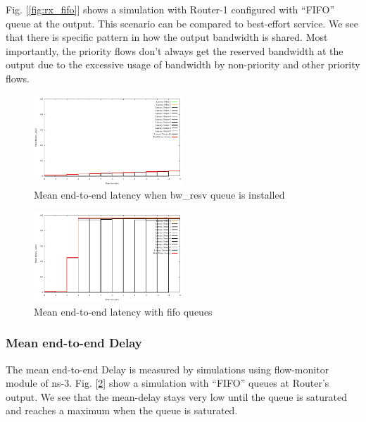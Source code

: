\documentclass[conference]{IEEEtran}
\begin{document}
Fig. [\ref{fig:rx_fifo}] shows a simulation with Router-1 configured with ``FIFO'' queue at the output. This scenario can be compared to best-effort service. We see that there is specific pattern in how the output bandwidth is shared. Most importantly, the priority flows don't always get the reserved bandwidth at the output due to the excessive usage of bandwidth by non-priority and other priority flows.

\begin{figure}[ht]
	\begin{center}
		\includegraphics[width=0.50\textwidth]{plots/delay_detnet.pdf}
		\caption{Mean end-to-end latency when bw\_resv queue is installed}\label{fig:delay_detnet}
	\end{center}
\end{figure}
\begin{figure}[ht]
	\begin{center}
		\includegraphics[width=0.50\textwidth]{plots/delay_fifo.pdf}
		\caption{Mean end-to-end latency with fifo queues}\label{fig:delay_fifo}
	\end{center}
\end{figure}

\subsubsection{Mean end-to-end Delay}
The mean end-to-end Delay is measured by simulations using flow-monitor module of ns-3. Fig. [\ref{fig:delay_fifo}] show a simulation with ``FIFO'' queues at Router's output. We see that the mean-delay stays very low until the queue is saturated and reaches a maximum when the queue is saturated. 
\end{document}
